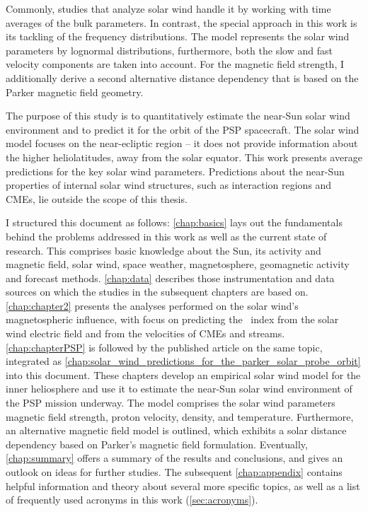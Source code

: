 Commonly, studies that analyze solar wind handle it by working with time averages of the bulk parameters. In contrast, the special approach in this work is its tackling of the frequency distributions. The model represents the solar wind parameters by lognormal distributions, furthermore, both the slow and fast velocity components are taken into account.
For the magnetic field strength, I additionally derive a second alternative distance dependency that is based on the Parker magnetic field geometry.

The purpose of this study is to quantitatively estimate the near-Sun solar wind environment and to predict it for the orbit of the PSP spacecraft.
The solar wind model focuses on the near-ecliptic region -- it does not provide information about the higher heliolatitudes, away from the solar equator.
This work presents average predictions for the key solar wind parameters. Predictions about the near-Sun properties of internal solar wind structures, such as interaction regions and CMEs, lie outside the scope of this thesis.


\bigskip

I structured this document as follows: \autoref{chap:basics} lays out the fundamentals behind the problems addressed in this work as well as the current state of research. This comprises basic knowledge about the Sun, its activity and magnetic field, solar wind, space weather, magnetosphere, geomagnetic activity and forecast methods. \autoref{chap:data} describes those instrumentation and data sources on which the studies in the subsequent chapters are based on. \autoref{chap:chapter2} presents the analyses performed on the solar wind's magnetospheric influence, with focus on predicting the \Kp~index from the solar wind electric field and from the velocities of CMEs and streams. \autoref{chap:chapterPSP} is followed by the published article on the same topic, integrated as \autoref{chap:solar_wind_predictions_for_the_parker_solar_probe_orbit} into this document. These chapters develop an empirical solar wind model for the inner heliosphere and use it to estimate the near-Sun solar wind environment of the PSP mission underway. The model comprises the solar wind parameters magnetic field strength, proton velocity, density, and temperature. Furthermore, an alternative magnetic field model is outlined, which exhibits a solar distance dependency based on Parker's magnetic field formulation. Eventually, \autoref{chap:summary} offers a summary of the results and conclusions, and gives an outlook on ideas for further studies. The subsequent \autoref{chap:appendix} contains helpful information and theory about several more specific topics, as well as a list of frequently used acronyms in this work (\autoref{sec:acronyms}).


